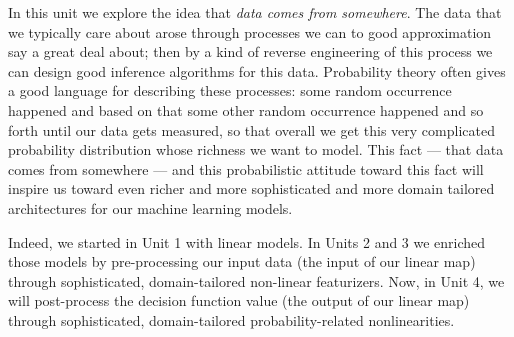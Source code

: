 


%
In this unit we explore the idea that \emph{data comes from somewhere}.  The data that
we typically care about arose through processes we can to good approximation say a
great deal about; then by a kind of reverse engineering of this process we can
design good inference algorithms for this data.  Probability theory often
gives a good language for describing these processes: some random occurrence
happened and based on that some other random occurrence happened and so forth
until our data gets measured, so that overall we get this very complicated
probability distribution whose richness we want to model.
%
This fact --- that data comes from somewhere --- and this probabilistic
attitude toward this fact will inspire us toward even richer and more
sophisticated and more domain tailored architectures for our machine learning
models.

Indeed, we started in Unit 1 with linear models.  In Units 2 and 3 we enriched
those models by pre-processing our input data (the input of our linear map)
through sophisticated, domain-tailored non-linear featurizers.  Now, in Unit 4,
we will post-process the decision function value (the output of our linear map)
through sophisticated, domain-tailored probability-related nonlinearities.

